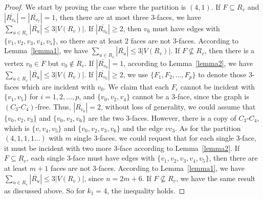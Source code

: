 \documentclass[12pt]{article}
\begin{document}
\begin{proof}
    We start by proving the case where the partition is $(4,1)$. If $F\subseteq R_v$ and $|\overline{R_{v_6}}|=|\overline{R_{v_7}}|=1$, then there are at most three $3$-faces, we have $\sum_{u \in R_v}|\overline{R_u}| \leq 3|V(R_v)|$. If $|\overline{R_{v_6}}| \geq 2$, then $v_6$ must have edges with $\{v_1,v_2,v_3,v_4,v_5\}$, so there are at least $2$ faces are not $3$-faces. According to Lemma~\ref{lemma1}, we have $\sum_{u \in R_v}|\overline{R_u}| \leq 3|V(R_v)|$. If $F\not\subseteq R_v$, then there is a vertex $v_0\in F$ but $v_0 \not\in R_v$. If $|\overline{R_{v_0}}|=1$, according to Lemma~\ref{lemma2}, we have $\sum_{u \in R_v}|\overline{R_u}| \leq 3|V(R_v)|$. If $|\overline{R_{v_0}}|\geq2$, we use $\{F_1,F_2,...,F_p\}$ to denote those $3$-faces which are incident with $v_0$. We claim that each $F_i$ cannot be incident with $\{v_1,v_5\}$ for $i=1,2,...,p$, and $\{v_0,v_2,v_4\}$ cannot be a $3$-face, since the graph is $(C_3\text{-}C_4)$-free. Thus, $|\overline{R_{v_0}}|=2$, without loss of generality, we could assume that $\{v_0,v_2,v_3\}$ and $\{v_0,v_3,v_6\}$ are the two $3$-faces. However, there is a copy of $C_3\text{-}C_4$, which is $\{v,v_4,v_5\}$ and $\{v_0,v_2,v_3,v_6\}$ and the edge $vv_3$. As for the partition $(4,1,1,1...)$ with $m$ single $3$-faces. we could request that for each single $3$-face, it must be incident with two more $3$-face according to Lemma~\ref{lemma2}. If $F \subseteq R_v$, each single $3$-face must have edges with $\{v_1,v_2,v_3,v_4,v_5\}$, then there are at least $m+1$ faces are not $3$-faces. According to Lemma~\ref{lemma1}, we have $\sum_{u \in R_v}|\overline{R_u}| \leq 3|V(R_v)|$, since $n=2m+6$. If $F \not\subseteq R_v$, we have the same result as discussed above. So for $k_1=4$, the inequality holds.
    

\end{proof}
\end{document}
